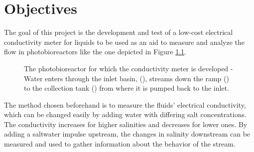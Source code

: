 \chapter{Objectives} \label{obj}

The goal of this project is the development and test of a low-cost electrical conductivity meter for liquids to be used as an aid to measure and analyze the flow in photobioreactors like the one depicted in Figure \ref{fig:pbr}.

\begin{figure}
	\begin{center}
	\tikzset{external/export next=false}
		\caption[The photobioreactor for which the conductivity meter is developed]{The photobioreactor for which the conductivity meter is developed - Water enters through the inlet basin, (), streams down the ramp () to the collection tank () from where it is pumped back to the inlet.}
		\label{fig:pbr}
	\end{center}
\end{figure}

The method chosen beforehand is to measure the fluids' electrical conductivity, which can be changed easily by adding water with differing salt concentrations. The conductivity increases for higher salinities and decreases for lower ones. By adding a saltwater impulse upstream, the changes in salinity downstream can be measured and used to gather information about the behavior of the stream.

